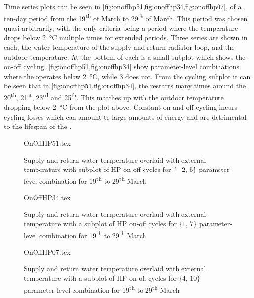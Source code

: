 Time series plots can be seen in \cref{fig:onoffhp51,fig:onoffhp34,fig:onoffhp07}, of a ten-day period from the 19\textsuperscript{th} of March to 29\textsuperscript{th} of March. This period was chosen quasi-arbitrarily, with the only criteria being a period where the temperature drops below \qty{2}{\celsius} multiple times for extended periods. Three series are shown in each, the water temperature of the supply and return radiator loop, and the outdoor temperature. At the bottom of each is a small subplot which shows the \HP on-off cycling. \cref{fig:onoffhp51,fig:onoffhp34} show parameter-level combinations where the \HP operates below \qty{2}{\celsius}, while \cref{fig:onoffhp07} does not. From the cycling subplot it can be seen that in \cref{fig:onoffhp51,fig:onoffhp34}, the \HP restarts many times around the 20\textsuperscript{th}, 21\textsuperscript{st}, 23\textsuperscript{rd} and 25\textsuperscript{th}. This matches up with the outdoor temperature dropping below \qty{2}{\celsius} from the plot above. Constant on and off cycling incurs cycling losses which can amount to large amounts of energy and are detrimental to the lifespan of the \HP \cite{bagarella_cycling_2013,dongellini_-off_2019}.

\begin{figure}[b]
    \centering
    {OnOffHP51.tex}
    \vspace*{-1.8\baselineskip}
    \caption[Supply and return water temperature, outdoor temperature and \acs{HP} on/off cycling for $\{-2\text{, }5\}$]{Supply and return water temperature overlaid with external temperature with subplot of \acs{HP} on-off cycles for $\{-2\text{, }5\}$ parameter-level combination for 19\textsuperscript{th} to 29\textsuperscript{th} March}
    \label{fig:onoffhp51}
\end{figure}

\begin{figure}[htb]
    \centering
    {OnOffHP34.tex}
    \vspace*{-1.8\baselineskip}
    \caption[Supply and return water temperature, outdoor temperature and \acs{HP} on/off cycling for $\{1\text{, }7\}$]{Supply and return water temperature overlaid with external temperature with a subplot of \acs{HP} on-off cycles for $\{1\text{, }7\}$ parameter-level combination for 19\textsuperscript{th} to 29\textsuperscript{th} March}
    \label{fig:onoffhp34}
\end{figure}

\begin{figure}[htb]
    \centering
    {OnOffHP07.tex}
    \vspace*{-1.8\baselineskip}
    \caption[Supply and return water temperature, outdoor temperature and \acs{HP} on/off cycling for $\{4\text{, }10\}$]{Supply and return water temperature overlaid with external temperature with a subplot of \acs{HP} on-off cycles for $\{4\text{, }10\}$ parameter-level combination for 19\textsuperscript{th} to 29\textsuperscript{th} March}
    \label{fig:onoffhp07}
\end{figure}


